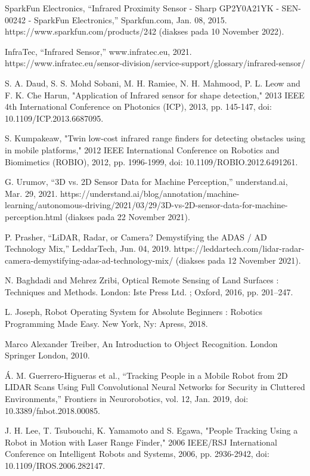 SparkFun Electronics, “Infrared Proximity Sensor - Sharp GP2Y0A21YK - SEN-00242 - SparkFun Electronics,” Sparkfun.com, Jan. 08, 2015. https://www.sparkfun.com/products/242 (diakses pada 10 November 2022).

InfraTec, “Infrared Sensor,” www.infratec.eu, 2021. https://www.infratec.eu/sensor-division/service-support/glossary/infrared-sensor/

S. A. Daud, S. S. Mohd Sobani, M. H. Ramiee, N. H. Mahmood, P. L. Leow and F. K. Che Harun, "Application of Infrared sensor for shape detection," 2013 IEEE 4th International Conference on Photonics (ICP), 2013, pp. 145-147, doi: 10.1109/ICP.2013.6687095.

S. Kumpakeaw, "Twin low-cost infrared range finders for detecting obstacles using in mobile platforms," 2012 IEEE International Conference on Robotics and Biomimetics (ROBIO), 2012, pp. 1996-1999, doi: 10.1109/ROBIO.2012.6491261.

G. Urumov, “3D vs. 2D Sensor Data for Machine Perception,” understand.ai, Mar. 29, 2021. https://understand.ai/blog/annotation/machine-learning/autonomous-driving/2021/03/29/3D-vs-2D-sensor-data-for-machine-perception.html (diakses pada 22 November 2021).

P. Prasher, “LiDAR, Radar, or Camera? Demystifying the ADAS / AD Technology Mix,” LeddarTech, Jun. 04, 2019. https://leddartech.com/lidar-radar-camera-demystifying-adas-ad-technology-mix/ (diakses pada 12 November 2021).

N. Baghdadi and Mehrez Zribi, Optical Remote Sensing of Land Surfaces : Techniques and Methods. London: Iste Press Ltd. ; Oxford, 2016, pp. 201–247.

L. Joseph, Robot Operating System for Absolute Beginners : Robotics Programming Made Easy. New York, Ny: Apress, 2018.

Marco Alexander Treiber, An Introduction to Object Recognition. London Springer London, 2010.

Á. M. Guerrero-Higueras et al., “Tracking People in a Mobile Robot from 2D LIDAR Scans Using Full Convolutional Neural Networks for Security in Cluttered Environments,” Frontiers in Neurorobotics, vol. 12, Jan. 2019, doi: 10.3389/fnbot.2018.00085.

J. H. Lee, T. Tsubouchi, K. Yamamoto and S. Egawa, "People Tracking Using a Robot in Motion with Laser Range Finder," 2006 IEEE/RSJ International Conference on Intelligent Robots and Systems, 2006, pp. 2936-2942, doi: 10.1109/IROS.2006.282147.

